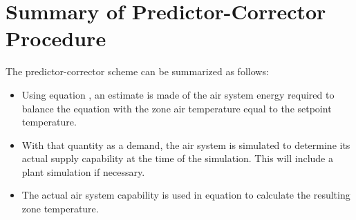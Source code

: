 \section{Summary of Predictor-Corrector Procedure}\label{summary-of-predictor-corrector-procedure}

The predictor-corrector scheme can be summarized as follows:

\begin{itemize}
\tightlist
\item
  Using equation , an estimate is made of the air system energy required to balance the equation with the zone air temperature equal to the setpoint temperature.
\item
  With that quantity as a demand, the air system is simulated to determine its actual supply capability at the time of the simulation. This will include a plant simulation if necessary.
\item
  The actual air system capability is used in equation to calculate the resulting zone temperature.
\end{itemize}

